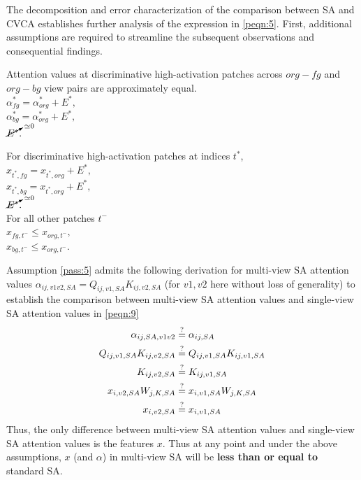 The decomposition and error characterization of the comparison between SA and CVCA establishes further analysis of the expression in \ref{peqn:5}. First, additional assumptions are required to streamline the subsequent observations and consequential findings.
\begin{assumption}
    Attention values at discriminative high-activation patches across $org-fg$ and $org-bg$ view pairs are approximately equal. \\
    $\alpha^*_{fg} = \alpha^*_{org} + E^*,$ \\
    $\alpha^*_{bg} = \alpha^*_{org} + E^*,$ \\
    $\cancelto{\simeq 0}{E^*}.$
\label{pass:4}
\end{assumption}
\begin{assumption}
    For discriminative high-activation patches at indices $t^*$, \\
    $x_{t^*,fg} = x_{t^*,org} + E^*,$ \\
    $x_{t^*,bg} = x_{t^*,org} + E^*,$ \\
    $\cancelto{\simeq 0}{E^*}.$ \\
    For all other patches $t^-$ \\
    $x_{fg,t^-} \leq x_{org,t^-},$ \\
    $x_{bg,t^-} \leq x_{org,t^-}.$
\label{pass:5}
\end{assumption}
Assumption \ref{pass:5} admits the following derivation for multi-view SA attention values $\alpha_{ij,v1v2,SA} = Q_{ij,v1,SA} K_{ij,v2,SA}$ (for $v1,v2$ here without loss of generality) to establish the comparison between multi-view SA attention values and single-view SA attention values in \ref{peqn:9}
\begin{equation}
\begin{aligned}
    \alpha_{ij,SA,v1v2} & \stackrel{?}{=} \alpha_{ij,SA} \\
    Q_{ij,v1,SA} K_{ij,v2,SA} & \stackrel{?}{=} Q_{ij,v1,SA} K_{ij,v1,SA} \\
    K_{ij,v2,SA} & \stackrel{?}{=} K_{ij,v1,SA} \\
    x_{i,v2,SA} W_{j,K,SA} & \stackrel{?}{=} x_{i,v1,SA} W_{j,K,SA} \\
    x_{i,v2,SA} & \stackrel{?}{=} x_{i,v1,SA} \\
\end{aligned}
\end{equation}
Thus, the only difference between multi-view SA attention values and single-view SA attention values is the features $x$. Thus at any point and under the above assumptions, $x$ (and $\alpha$) in multi-view SA will be \textbf{less than or equal to} standard SA.

